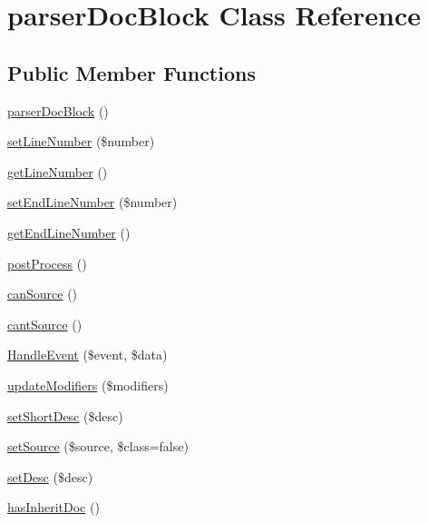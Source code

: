 \hypertarget{classparser_doc_block}{\section{parser\-Doc\-Block \-Class \-Reference}
\label{classparser_doc_block}
}
\subsection*{\-Public \-Member \-Functions}
\begin{DoxyCompactItemize}
\item 
\hyperlink{classparser_doc_block_a3c8660f25474391c7f4c003090d7b769}{parser\-Doc\-Block} ()
\item 
\hyperlink{classparser_doc_block_ae510a35d05668f49bb363f3589c3659a}{set\-Line\-Number} (\$number)
\item 
\hyperlink{classparser_doc_block_ac145ff339a8c5cb3df6b29f76bd1168e}{get\-Line\-Number} ()
\item 
\hyperlink{classparser_doc_block_a8c9c0b837ed2371d1aa8bb52340baa95}{set\-End\-Line\-Number} (\$number)
\item 
\hyperlink{classparser_doc_block_aed9e01150ce8c19289329f5cd51c7d18}{get\-End\-Line\-Number} ()
\item 
\hyperlink{classparser_doc_block_a3001e7a28444f7a3e2393e924c1fdafb}{post\-Process} ()
\item 
\hyperlink{classparser_doc_block_a7795cb83bb904881dba39b820513aa05}{can\-Source} ()
\item 
\hyperlink{classparser_doc_block_aff52c828b67b165736006bc0860c9d84}{cant\-Source} ()
\item 
\hyperlink{classparser_doc_block_a2315978686182f0bdb05425d81358b38}{\-Handle\-Event} (\$event, \$data)
\item 
\hyperlink{classparser_doc_block_a5a58057d6871c5e9904e193fdeb7f58e}{update\-Modifiers} (\$modifiers)
\item 
\hyperlink{classparser_doc_block_ad0c8f4b7d099bf69f2a4fba8e57f9508}{set\-Short\-Desc} (\$desc)
\item 
\hyperlink{classparser_doc_block_ae0f8c008fd80913cb81e2dc4ee0d6dc6}{set\-Source} (\$source, \$class=false)
\item 
\hyperlink{classparser_doc_block_a68a5a83960544909efe11b79aba0c502}{set\-Desc} (\$desc)
\item 
\hyperlink{classparser_doc_block_aa7db01ece1b87c335aa3d3d66e9cef68}{has\-Inherit\-Doc} ()
\item 

\end{DoxyCompactItemize}

